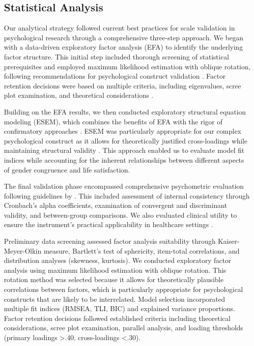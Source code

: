 \documentclass[12pt,a4paper]{article}
\begin{document}
\subsection{Statistical Analysis}

Our analytical strategy followed current best practices for scale validation in psychological research \parencite{Costello2005, Brown2015} through a comprehensive three-step approach. We began with a data-driven exploratory factor analysis (EFA) to identify the underlying factor structure. This initial step included thorough screening of statistical prerequisites and employed maximum likelihood estimation with oblique rotation, following recommendations for psychological construct validation \parencite{Fabrigar1999}. Factor retention decisions were based on multiple criteria, including eigenvalues, scree plot examination, and theoretical considerations \parencite{Horn1965, Cattell1966}.

Building on the EFA results, we then conducted exploratory structural equation modeling (ESEM), which combines the benefits of EFA with the rigor of confirmatory approaches \parencite{Asparouhov2009}. ESEM was particularly appropriate for our complex psychological construct as it allows for theoretically justified cross-loadings while maintaining structural validity \parencite{Marsh2014}. This approach enabled us to evaluate model fit indices while accounting for the inherent relationships between different aspects of gender congruence and life satisfaction.

The final validation phase encompassed comprehensive psychometric evaluation following guidelines by \textcite{Nunnally1994}. This included assessment of internal consistency through Cronbach's alpha coefficients, examination of convergent and discriminant validity, and between-group comparisons. We also evaluated clinical utility to ensure the instrument's practical applicability in healthcare settings \parencite{DeVellis2016}.

Preliminary data screening assessed factor analysis suitability through Kaiser-Meyer-Olkin measure, Bartlett's test of sphericity, item-total correlations, and distribution analyses (skewness, kurtosis). We conducted exploratory factor analysis using maximum likelihood estimation with oblique rotation. This rotation method was selected because it allows for theoretically plausible correlations between factors, which is particularly appropriate for psychological constructs that are likely to be interrelated. Model selection incorporated multiple fit indices (RMSEA, TLI, BIC) and explained variance proportions. Factor retention decisions followed established criteria including theoretical considerations, scree plot examination, parallel analysis, and loading thresholds (primary loadings >.40, cross-loadings <.30).
\end{document}
